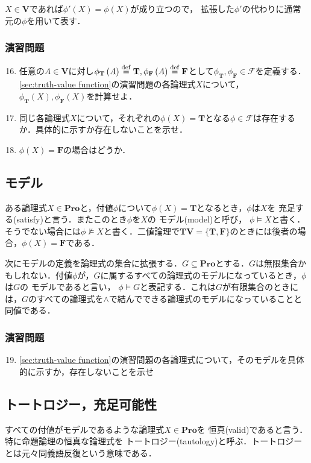 \documentclass{ltjsarticle}
\theoremstyle{mystyle1}
\theoremstyle{mystyle3}
\theoremstyle{mystyle2}
\newcommand{\bT}{\ensuremath{\mathbf{T}}}
\newcommand{\bF}{\ensuremath{\mathbf{F}}}
\newcommand{\bV}{\ensuremath{\mathbf{V}}}
\newcommand{\bPro}{\ensuremath{\mathbf{Pro}}}
\newcommand{\cF}{\ensuremath{\mathcal{F}}}
\newcommand{\dequal}{\ensuremath{\stackrel{\rm{def}}{=}}}
\newcommand{\red}[1]{{\color{red} #1}}
\begin{document}
$X\in\bV$であれば$\phi'\left(X\right) =\phi\left(X\right)$が成り立つので， 拡張した$\phi'$の代わりに通常元の$\phi$を用いて表す．
\subsubsection*{演習問題}
\begin{enumerate}
  \setcounter{enumi}{15}
  \item 任意の$A\in\bV$に対し$\phi_\bT\left(A\right)\dequal\bT,\phi_\bF\left(A\right)\dequal\bF$として$\phi_\bT,\phi_\bF\in\cF$を定義する．\ref{sec:truth-value function}の演習問題の各論理式$X$について，$\phi_\bT\left(X\right),\phi_\bF\left(X\right)$を計算せよ．
  \item 同じ各論理式$X$について，それぞれの$\phi\left(X\right)=\bT$となる$\phi\in\cF$は存在するか．具体的に示すか存在しないことを示せ．
  \item $\phi\left(X\right)=\bF$の場合はどうか．
\end{enumerate}
\subsection{モデル}
ある論理式$X\in\bPro$と，付値$\phi$について$\phi\left(X\right)=\bT$となるとき，$\phi$は$X$を\red{充足する}(satisfy)と言う．またこのとき$\phi$を$X$の\red{モデル}(model)と呼び，\red{$\phi\models X$}と書く．そうでない場合には$\phi\not\models X$と書く．二値論理で$\bT\bV = \{\bT, \bF\}$のときには後者の場合，$\phi\left(X\right) = \bF$である．

次にモデルの定義を論理式の集合に拡張する．$G\subseteq\bPro$とする．$G$は無限集合かもしれない．付値$\phi$が，$G$に属するすべての論理式のモデルになっているとき，$\phi$は$G$の\red{モデル}であると言い，\red{$\phi\models G$}と表記する．これは$G$が有限集合のときには，$G$のすべての論理式を$\wedge$で結んでできる論理式のモデルになっていることと同値である．
\subsubsection*{演習問題}
\begin{enumerate}
  \setcounter{enumi}{18}
  \item \ref{sec:truth-value function}の演習問題の各論理式について，そのモデルを具体的に示すか，存在しないことを示せ
\end{enumerate}
\subsection{トートロジー，充足可能性}
すべての付値がモデルであるような論理式$X\in\bPro$を\red{恒真}(valid)であると言う．特に命題論理の恒真な論理式を\red{トートロジー}(tautology)と呼ぶ．トートロジーとは元々同義語反復という意味である．
\end{document}
